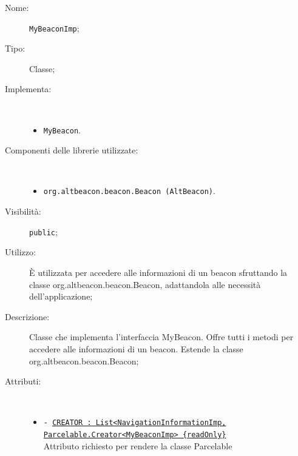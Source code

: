 \documentclass[../DefinizioneDiProdotto.tex]{subfiles}
\begin{document}
    \begin{description}
\item[Nome:] \texttt{MyBeaconImp};
\item[Tipo:] Classe;
\item[Implementa:] \
\begin{itemize}
\item \texttt{MyBeacon}.

\end{itemize}
\item[Componenti delle librerie utilizzate:] \
\begin{itemize}
\item \texttt{org.altbeacon.beacon.Beacon (AltBeacon)}.

\end{itemize}
\item[Visibilità:] \texttt{public};
\item[Utilizzo:] È utilizzata per accedere alle informazioni di un beacon sfruttando la classe org.altbeacon.beacon.Beacon, adattandola alle necessità dell'applicazione;
\item[Descrizione:] Classe che implementa l'interfaccia MyBeacon. Offre tutti i metodi per accedere alle informazioni di un beacon. Estende la classe org.altbeacon.beacon.Beacon;
\item[Attributi:] \
\begin{itemize}
\item \texttt{- \underline{CREATOR : List<NavigationInformationImp,}\\\underline{Parcelable.Creator<MyBeaconImp> \{readOnly\}}}\\
Attributo richiesto per rendere la classe Parcelable


\end{itemize}
\end{description}
\end{document}

